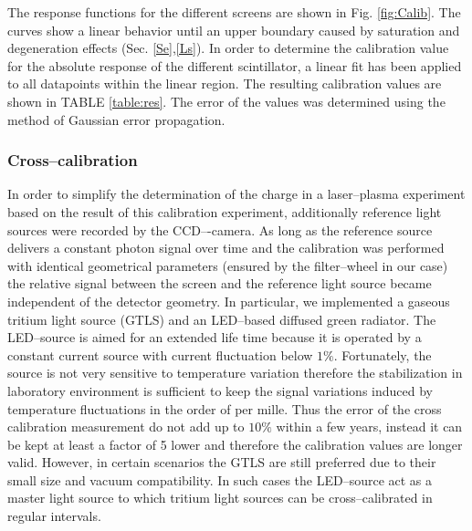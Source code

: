 \documentclass[%
reprint,
amsmath,
amssymb,
aip,
rsi, 
numerical,
floatfix,
]{revtex4-1}
\begin{document}
The response functions for the different screens are shown in Fig. \ref{fig:Calib}.
The curves show a linear behavior until an upper boundary caused by saturation and degeneration effects (Sec. \ref{Se},\ref{Ls}).  
In order to determine the calibration value for the absolute response of the different scintillator, a linear fit has been applied to all datapoints within the linear region.
The resulting calibration values are shown in TABLE \ref{table:res}. 
The error of the values was determined using the method of Gaussian error propagation.
   


\subsubsection{\label{Cc}Cross--calibration} 
In order to simplify the determination of the charge in a laser--plasma experiment based on the result of this calibration experiment, additionally reference light sources were recorded by the CCD–-camera. 
As long as the reference source delivers a constant photon signal over time and the calibration was performed with identical geometrical parameters (ensured by the filter--wheel in our case) the relative signal between the screen and the reference light source became independent of the detector geometry.
In particular, we implemented a gaseous tritium light source (GTLS) and an LED--based diffused green radiator.
The LED--source is aimed for an extended life time because it is operated by a constant current source with current fluctuation below $1\%$.
Fortunately, the source is not very sensitive to temperature variation therefore the stabilization in laboratory environment is sufficient to keep the signal variations induced by temperature fluctuations in the order of per mille.  
Thus the error of the cross calibration measurement do not add up to $10\%$ within a few years, instead it can be kept at least a factor of 5 lower and therefore the calibration values are longer valid.
However, in certain scenarios the GTLS are still preferred due to their small size and vacuum compatibility.
In such cases the LED--source act as a master light source to which tritium light sources can be cross--calibrated in regular intervals.
\end{document}
